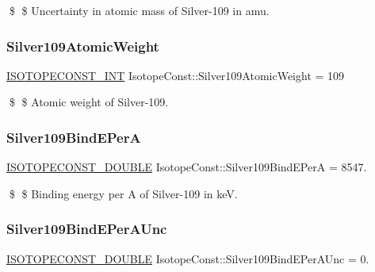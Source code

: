 \$ \$ Uncertainty in atomic mass of Silver-\/109 in amu. \mbox{\label{group___isotope_const-_silver-_ag109_gad4844dfc786863731d2b74c613277413}} 
\subsubsection{\texorpdfstring{Silver109\+Atomic\+Weight}{Silver109AtomicWeight}}
{\footnotesize\ttfamily \mbox{\hyperlink{group___isotope_const-_macros_ga5f18360b3e99483a35c32d789e62621c}{I\+S\+O\+T\+O\+P\+E\+C\+O\+N\+S\+T\+\_\+\+I\+NT}} Isotope\+Const\+::\+Silver109\+Atomic\+Weight = 109}

\$ \$ Atomic weight of Silver-\/109. \mbox{\label{group___isotope_const-_silver-_ag109_ga926471ec3f1e6fc618c33fa1352fef14}} 
\subsubsection{\texorpdfstring{Silver109\+Bind\+E\+PerA}{Silver109BindEPerA}}
{\footnotesize\ttfamily \mbox{\hyperlink{group___isotope_const-_macros_ga8f45a7272ce02c0b4c65c44636ed719a}{I\+S\+O\+T\+O\+P\+E\+C\+O\+N\+S\+T\+\_\+\+D\+O\+U\+B\+LE}} Isotope\+Const\+::\+Silver109\+Bind\+E\+PerA = 8547.}

\$ \$ Binding energy per A of Silver-\/109 in keV. \mbox{\label{group___isotope_const-_silver-_ag109_ga598c0c4ccbd33ac1d4206250d98c463f}} 
\subsubsection{\texorpdfstring{Silver109\+Bind\+E\+Per\+A\+Unc}{Silver109BindEPerAUnc}}
{\footnotesize\ttfamily \mbox{\hyperlink{group___isotope_const-_macros_ga8f45a7272ce02c0b4c65c44636ed719a}{I\+S\+O\+T\+O\+P\+E\+C\+O\+N\+S\+T\+\_\+\+D\+O\+U\+B\+LE}} Isotope\+Const\+::\+Silver109\+Bind\+E\+Per\+A\+Unc = 0.}

